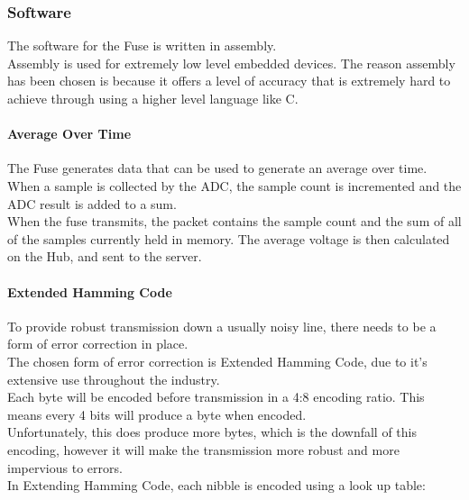 \documentclass[draft,preprint,12pt,3p]{elsarticle}
\begin{document}
\subsubsection{Software}
The software for the Fuse is written in assembly.\\
Assembly is used for extremely low level embedded devices. The reason assembly has been chosen is because it offers a level of accuracy that is extremely hard to achieve through using a higher level language like C.\\

\paragraph{Average Over Time}
The Fuse generates data that can be used to generate an average over time.\\
When a sample is collected by the ADC, the sample count is incremented and the ADC result is added to a sum.\\
When the fuse transmits, the packet contains the sample count and the sum of all of the samples currently held in memory. The average voltage is then calculated on the Hub, and sent to the server.

\paragraph{Extended Hamming Code}
To provide robust transmission down a usually noisy line, there needs to be a form of error correction in place.\\
The chosen form of error correction is Extended Hamming Code, due to it's extensive use throughout the industry.\\
Each byte will be encoded before transmission in a 4:8 encoding ratio. This means every 4 bits will produce a byte when encoded.\\
Unfortunately, this does produce more bytes, which is the downfall of this encoding, however it will make the transmission more robust and more impervious to errors.\\
In Extending Hamming Code, each nibble is encoded using a look up table:
\end{document}
